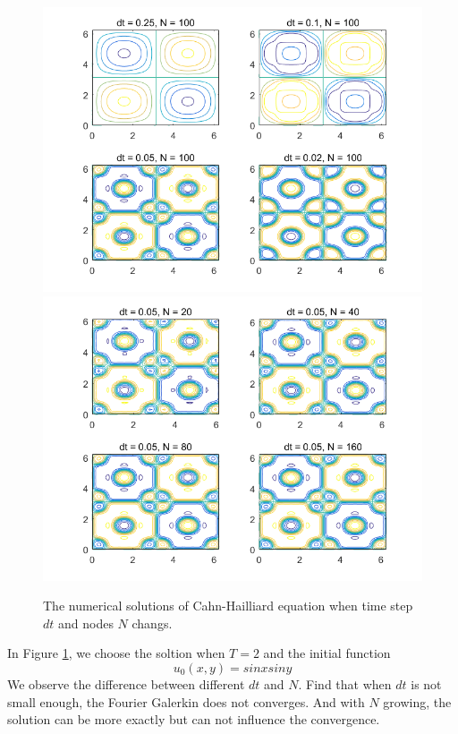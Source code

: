\documentclass[a4paper]{article}
\begin{document}
\begin{figure}[h]
    \centering
    \includegraphics[scale=0.4]{Cahn_Hilliard_dt.png}
    \includegraphics[scale=0.4]{Cahn_Hilliard_N.png}
    \caption{The numerical solutions of Cahn-Hailliard equation when time step $dt$ and nodes $N$ changs.}
    \label{im::2D_Cahn_Hilliard_parameter}
\end{figure}
In Figure \ref{im::2D_Cahn_Hilliard_parameter}, we choose the soltion when $T=2$ and the initial function 
\begin{equation}
    u_0(x,y)=sinxsiny
\end{equation}
We observe the difference between different $dt$ and $N$. Find that when $dt$ is not small enough, the Fourier Galerkin does not converges. And with $N$ growing, the solution can be more exactly but can not influence the convergence. 
\newpage
\end{document}
